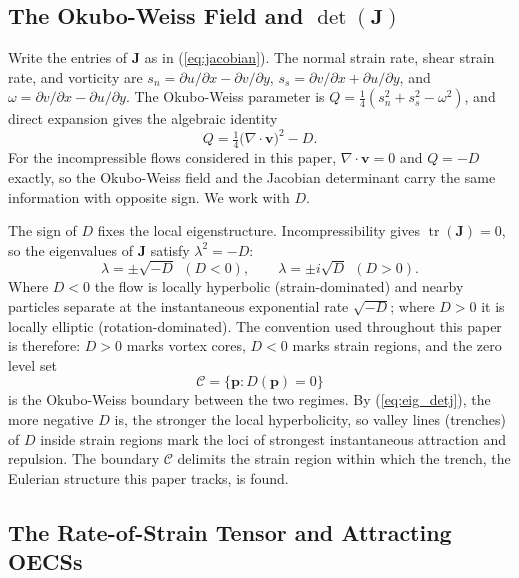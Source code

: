 \documentclass[lettersize,journal]{IEEEtran}
\begin{document}
\subsection{The Okubo-Weiss Field and $\det(\mathbf{J})$}

Write the entries of $\mathbf{J}$ as in (\ref{eq:jacobian}). The normal
strain rate, shear strain rate, and vorticity are
$s_n = \partial u/\partial x - \partial v/\partial y$,
$s_s = \partial v/\partial x + \partial u/\partial y$, and
$\omega = \partial v/\partial x - \partial u/\partial y$. The Okubo-Weiss
parameter \cite{21,22} is $Q = \tfrac{1}{4}(s_n^2 + s_s^2 - \omega^2)$, and
direct expansion gives the algebraic identity
\begin{equation}
    Q = \tfrac{1}{4}\bigl(\nabla \cdot \mathbf{v}\bigr)^2 - D.
    \label{eq:okubo_weiss}
\end{equation}
For the incompressible flows considered in this paper,
$\nabla \cdot \mathbf{v} = 0$ and $Q = -D$ exactly, so the Okubo-Weiss
field and the Jacobian determinant carry the same information with
opposite sign. We work with $D$.

The sign of $D$ fixes the local eigenstructure. Incompressibility gives
$\operatorname{tr}(\mathbf{J}) = 0$, so the eigenvalues of $\mathbf{J}$
satisfy $\lambda^2 = -D$:
\begin{equation}
    \lambda = \pm\sqrt{-D} \ \ (D < 0), \qquad
    \lambda = \pm i\sqrt{D} \ \ (D > 0).
    \label{eq:eig_detj}
\end{equation}
Where $D < 0$ the flow is locally hyperbolic (strain-dominated) and
nearby particles separate at the instantaneous exponential rate
$\sqrt{-D}$; where $D > 0$ it is locally elliptic (rotation-dominated).
The convention used throughout this paper is therefore: $D > 0$ marks
vortex cores, $D < 0$ marks strain regions, and the zero level set
\begin{equation}
    \mathcal{C} = \{\mathbf{p} : D(\mathbf{p}) = 0\}
    \label{eq:ow_boundary}
\end{equation}
is the Okubo-Weiss boundary between the two regimes. By
(\ref{eq:eig_detj}), the more negative $D$ is, the stronger the local
hyperbolicity, so valley lines (trenches) of $D$ inside strain regions
mark the loci of strongest instantaneous attraction and repulsion. The
boundary $\mathcal{C}$ delimits the strain region within which the
trench, the Eulerian structure this paper tracks, is found.

\subsection{The Rate-of-Strain Tensor and Attracting OECSs}
\label{sec:strain_field}
\end{document}
